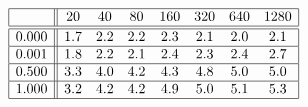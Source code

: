 \[
\begin{array}{|c||ccccccc|}
\hline 
& 20 & 40 & 80 & 160 & 320 & 640 & 1280\\
\hline \hline 
0.000 & 1.7 & 2.2 & 2.2 & 2.3 & 2.1 & 2.0 & 2.1 \\ \hline 
0.001 & 1.8 & 2.2 & 2.1 & 2.4 & 2.3 & 2.4 & 2.7 \\ \hline 
0.500 & 3.3 & 4.0 & 4.2 & 4.3 & 4.8 & 5.0 & 5.0 \\ \hline 
1.000 & 3.2 & 4.2 & 4.2 & 4.9 & 5.0 & 5.1 & 5.3 \\ \hline 
\end{array}
\]

